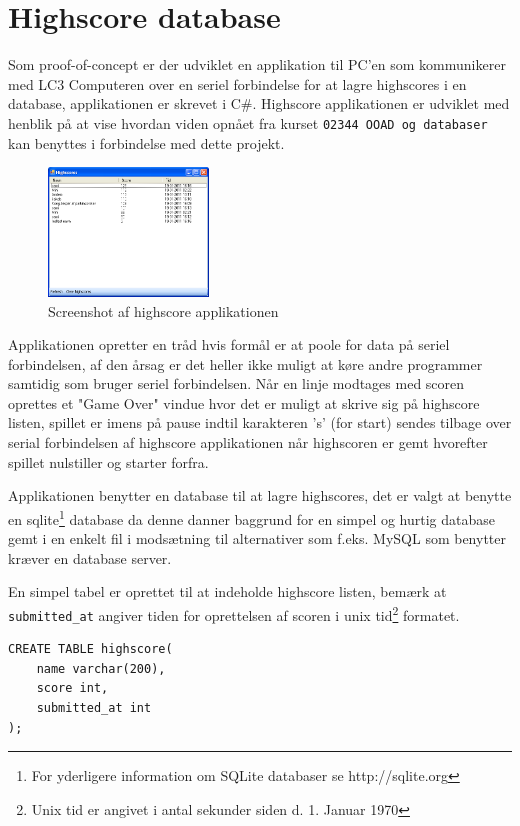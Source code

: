 \section{Highscore database}
Som proof-of-concept er der udviklet en applikation til PC'en som kommunikerer med LC3 Computeren over en seriel forbindelse for at lagre highscores i en database, applikationen er skrevet i C\#. Highscore applikationen er udviklet med henblik på at vise hvordan viden opnået fra kurset \texttt{02344 OOAD og databaser} kan benyttes i forbindelse med dette projekt.

\begin{figure}
  \begin{center}
    \includegraphics[width=0.38\textwidth]{billeder/HighscoreBoard}
  \end{center}
  \caption{Screenshot af highscore applikationen}
\end{figure}

Applikationen opretter en tråd hvis formål er at poole for data på seriel forbindelsen, af den årsag er det heller ikke muligt at køre andre programmer samtidig som bruger seriel forbindelsen. Når en linje modtages med scoren oprettes et "Game Over" vindue hvor det er muligt at skrive sig på highscore listen, spillet er imens på pause indtil karakteren 's' (for start) sendes tilbage over serial forbindelsen af highscore applikationen når highscoren er gemt hvorefter spillet nulstiller og starter forfra.

Applikationen benytter en database til at lagre highscores, det er valgt at benytte en sqlite\footnote{For yderligere information om SQLite databaser se http://sqlite.org} database da denne danner baggrund for en simpel og hurtig database gemt i en enkelt fil i modsætning til alternativer som f.eks. MySQL som benytter kræver en database server.

En simpel tabel er oprettet til at indeholde highscore listen, bemærk at \texttt{submitted\_at} angiver tiden for oprettelsen af scoren i unix tid\footnote{Unix tid er angivet i antal sekunder siden d. 1. Januar 1970} formatet.

\lstset{language=SQL}
\begin{lstlisting}
CREATE TABLE highscore(
	name varchar(200),
	score int,
	submitted_at int
);
\end{lstlisting}